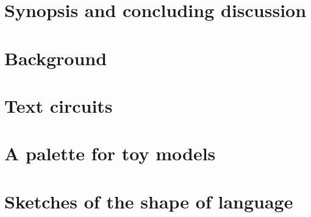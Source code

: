 



\maketitle%

\tableofcontents{}

\setcounter{chapter}{-1}
\chapter{Synopsis and concluding discussion}
\newpage

\newpage

\chapter{Background}\label{chapter:stringdiagrams}
\newpage
\label{sec:proctheory}
\newpage

\newpage

\chapter{Text circuits}\label{chapter:textcircuits}
\newpage
\label{sec:ncat}
\newpage

\newpage

\newpage


\chapter{A palette for toy models}\label{chapter:contrel}
\newpage

\newpage

\newpage

\newpage
\label{sec:topconcepts}
\newpage

\newpage

\newpage

\chapter{Sketches of the shape of language}\label{chapter:sketches}
\newpage
\label{sec:lassos}
\newpage

\newpage









